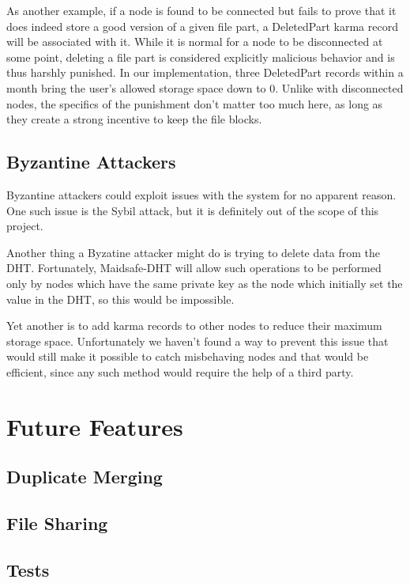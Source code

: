\documentclass{acm_}
\begin{document}
As another example, if a node is found to be connected but fails to prove that it does indeed store a good version of a given file part, a DeletedPart karma record will be associated with it. While it is normal for a node to be disconnected at some point, deleting a file part is considered explicitly malicious behavior and is thus harshly punished. In our implementation, three DeletedPart records within a month bring the user's allowed storage space down to 0. Unlike with disconnected nodes, the specifics of the punishment don't matter too much here, as long as they create a strong incentive to keep the file blocks.



\subsection{Byzantine Attackers}

Byzantine attackers could exploit issues with the system for no apparent reason. One such issue is the Sybil attack\cite{sybil}, but it is definitely out of the scope of this project. 

Another thing a Byzatine attacker might do is trying to delete data from the DHT. Fortunately, Maidsafe-DHT will allow such operations to be performed only by nodes which have the same private key as the node which initially set the value in the DHT, so this would be impossible.

Yet another is to add karma records to other nodes to reduce their maximum storage space. Unfortunately we haven't found a way to prevent this issue that would still make it possible to catch misbehaving nodes and that would be efficient, since any such method would require the help of a third party.

\section{Future Features}

\subsection{Duplicate Merging}

\subsection{File Sharing}

\subsection{Tests}
\end{document}
